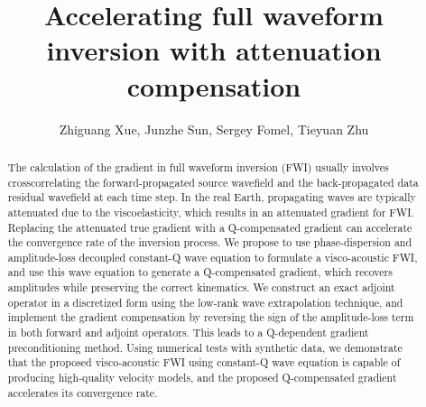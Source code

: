 \title{Accelerating full waveform inversion with attenuation compensation}
\author{Zhiguang Xue, Junzhe Sun, Sergey Fomel, Tieyuan Zhu}
\maketitle

\address{
\footnotemark[1]Bureau of Economic Geology \\
John A. and Katherine G. Jackson School of Geosciences \\
The University of Texas at Austin \\
University Station, Box X \\
Austin, Texas, USA \\
\footnotemark[2]Department of Geosciences and Institute of Natural Gas Research \\
The Pennsylvania State University \\
University Park, Pennsylvania, USA
}



\begin{abstract}
	The calculation of the gradient in full waveform inversion (FWI) usually involves crosscorrelating the forward-propagated source wavefield and the back-propagated data residual wavefield at each time step.
	In the real Earth, propagating waves are typically attenuated due to the viscoelasticity, which results in an attenuated gradient for FWI.
	Replacing the attenuated true gradient with a Q-compensated gradient can accelerate the convergence rate of the inversion process.
	We propose to use phase-dispersion and amplitude-loss decoupled constant-Q wave equation to formulate a visco-acoustic FWI,
	and use this wave equation to generate a Q-compensated gradient, which recovers amplitudes while preserving the correct kinematics.
	We construct an exact adjoint operator in a discretized form using the low-rank wave extrapolation technique,
	and implement the gradient compensation by reversing the sign of the amplitude-loss term in both forward and adjoint operators.
	This leads to a Q-dependent gradient preconditioning method.
	Using numerical tests with synthetic data, we demonstrate that the proposed visco-acoustic FWI using constant-Q wave equation is capable of producing high-quality velocity models,
	and the proposed Q-compensated gradient accelerates its convergence rate.
\end{abstract}

